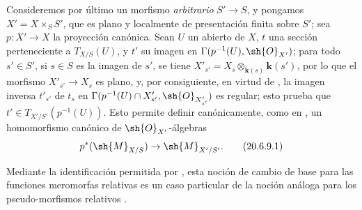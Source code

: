 \begin{env}[20.6.9]
\label{IV.20.6.9}
Consideremos por último un morfismo \emph{arbitrario} $S'\to S$, y pongamos $X'=X\times_S S'$, que es plano y localmente de presentación finita sobre $S'$; sea $p:X'\to X$ la proyección canónica.
Sean $U$ un abierto de $X$, $t$ una sección perteneciente a $T_{X/S}(U)$, y $t'$ su imagen en $\Gamma(p^{-1}(U),\sh{O}_{X'})$; para todo $s'\in S'$, si $s\in S$ es la imagen de $s'$, se tiene $X'_{s'}=X_s\otimes_{\mathbf{k}(s)}\boldsymbol{k}(s')$, por lo que el morfismo $X'_{s'}\to X_s$ es plano, y, por consiguiente, en virtud de , la imagen inversa $t'_{s'}$ de $t_s$ en $\Gamma(p^{-1}(U)\cap X'_{s'},\sh{O}_{X'_{s'}})$ es regular; esto prueba que $t'\in T_{X'/S'}(p^{-1}(U))$.
Esto permite definir canónicamente, como en , un homomorfismo canónico de $\sh{O}_{X'}$-álgebras
\[
\label{IV.20.6.9.1}
  p^*(\sh{M}_{X/S})\to\sh{M}_{X'/S'}.
  \tag{20.6.9.1}
\]

Mediante la identificación permitida por , esta noción de cambio de base para las funciones meromorfas relativas es un caso particular de la noción análoga para los pseudo-morfismos relativos .
\end{env}
